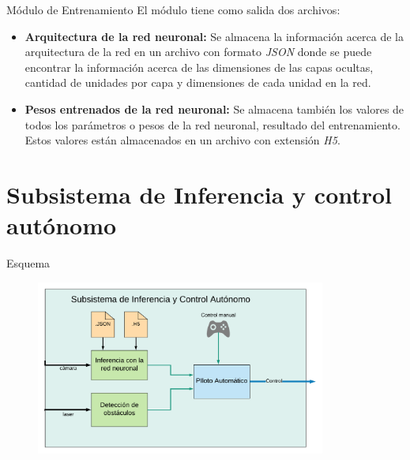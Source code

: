 \documentclass[10pt]{beamer}
\begin{document}
\begin{frame}{Módulo de Entrenamiento}
    El módulo tiene como salida dos archivos:

    \begin{itemize}
        \item \textbf{Arquitectura de la red neuronal:} Se almacena la información acerca de la arquitectura de la red en un archivo con formato \emph{JSON} donde se puede encontrar la información acerca de las dimensiones de las capas ocultas, cantidad de unidades por capa y dimensiones de cada unidad en la red.
        \item \textbf{Pesos entrenados de la red neuronal:} Se almacena también los valores de todos los parámetros o pesos de la red neuronal, resultado del entrenamiento. Estos valores están almacenados en un archivo con extensión \emph{H5}. 
    \end{itemize}

\end{frame}


\section{Subsistema de Inferencia y control autónomo}
\begin{frame}{Esquema}
    \begin{figure}[!h] 
        \centering
        \includegraphics[width=0.85\textwidth]{../img/inferencia_esq}
        \end{figure}
\end{frame}

\end{document}
